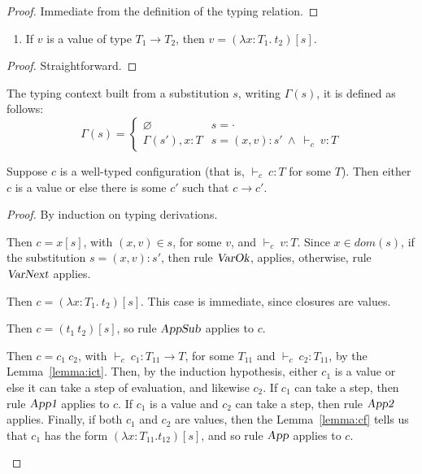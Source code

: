 \documentclass {article}
\newcommand{\tto}{\longrightarrow}
\newcommand{\absD}{\lambda x:T_1. \ t_2}
\newcommand{\conf}[2][s]{(#2)[#1]}
\newcommand{\Subx}{(x,v):s'}
\newcommand{\tyC}{{\vdash_c \ }}
\begin{document}
\begin{proof}Immediate from the definition of the typing relation.
\end{proof}

\begin{lemma} 
\label{lemma:cf}
\mbox{}
\begin{enumerate}
\item If $v$ is a value of type $T_1 \to T_2$, then $v = \conf{\absD}$.
\end{enumerate}
\end{lemma}

\begin{proof} Straightforward.
\end{proof}

\begin{definition}[$\Gamma(s)$]
\label{definition:tcs}
\mbox{}
The typing context built from a substitution $s$, writing $\Gamma(s)$, it is defined as follows:
\[ \Gamma(s) = \begin{cases} 
     \varnothing & s = \cdot \\
      \Gamma(s'), x:T & s = (x,v):s' \ \land \ \tyC v : T 
   \end{cases}
\]
\end{definition}

\begin{theorem}[Progress]
\label{theorem:progress}
\mbox{}
Suppose $c$ is a well-typed configuration (that is, $ \tyC c : T$ for some $T$). Then either $c$ is a value or else there is some $c'$ such that $c \tto c'$.
\end{theorem}

\begin{proof} By induction on typing derivations.
\begin{case}[TCVar]
Then $c = x[s]$, with $(x,v) \in s$, for some $v$,  and $\tyC v:T$. Since $x \in dom(s)$, if the substitution $s = \Subx$, then rule $\textsl {VarOk}$, applies, otherwise, rule $\textsl {VarNext}$ applies.
\end{case}

\begin{case}[TCAbs]
 Then $c = \conf{\absD}$. This case is immediate, since closures are values.
\end{case}

\begin{case}[TCApp] 
 Then $c = \conf{t_1 \ t_2}$, so rule $\textsl {AppSub}$ applies to $c$.
\end{case}

\begin{case}[TCCApp]
 Then $c = c_1 \ c_2$, with $\tyC c_1 : T_{11} \to T$, for some $T_{11}$ and $\tyC c_2 : T_{11}$, by the Lemma~\ref{lemma:ict}. Then, by the induction hypothesis, either $c_1$ is a value or else it can take a step of evaluation, and likewise $c_2$. If $c_1$ can take a step, then rule $\textsl {App1}$ applies to $c$. If $c_1$ is a value and $c_2$ can take a step, then rule $\textsl {App2}$ applies. Finally, if both $c_1$ and $c_2$ are values, then the Lemma~\ref{lemma:cf} tells us that $c_1$ has the form $\conf{\lambda x: T_{11}.t_{12}}$, and so rule $\textsl {App}$ applies to $c$.
\end{case}
\end{proof}
\end{document}
